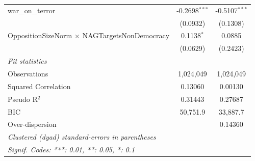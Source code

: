 \begin{tabular}{lcc}
   war\_on\_terror                                     & -0.2698$^{***}$   & -0.5107$^{***}$\\   
                                                       & (0.0932)          & (0.1308)\\   
   OppositionSizeNorm $\times$ NAGTargetsNonDemocracy  & 0.1138$^{*}$      & 0.0885\\   
                                                       & (0.0629)          & (0.2423)\\   
   \midrule
   \emph{Fit statistics}\\
   Observations                                        & 1,024,049         & 1,024,049\\  
   Squared Correlation                                 & 0.13060           & 0.00130\\  
   Pseudo R$^2$                                        & 0.31443           & 0.27687\\  
   BIC                                                 & 50,751.9          & 33,887.7\\  
   Over-dispersion                                     &                   & 0.14360\\  
   \midrule \midrule
   \multicolumn{3}{l}{\emph{Clustered (dyad) standard-errors in parentheses}}\\
   \multicolumn{3}{l}{\emph{Signif. Codes: ***: 0.01, **: 0.05, *: 0.1}}\\
\end{tabular}
\par\endgroup


